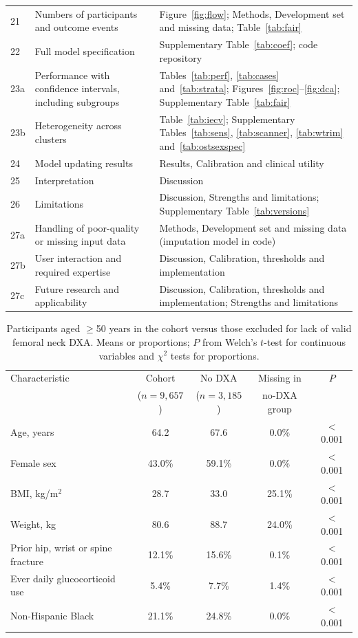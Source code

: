 \documentclass[11pt,a4paper]{article}
\begin{document}
\begin{longtable}{p{1.0cm}p{6.4cm}p{7.1cm}}
21 & Numbers of participants and outcome events & Figure~\ref{fig:flow}; Methods, Development set and missing data; Table~\ref{tab:fair} \\
22 & Full model specification & Supplementary Table~\ref{tab:coef}; code repository \\
23a & Performance with confidence intervals, including subgroups & Tables~\ref{tab:perf}, \ref{tab:cases} and~\ref{tab:strata}; Figures~\ref{fig:roc}--\ref{fig:dca}; Supplementary Table~\ref{tab:fair} \\
23b & Heterogeneity across clusters & Table~\ref{tab:iecv}; Supplementary Tables~\ref{tab:sens}, \ref{tab:scanner}, \ref{tab:wtrim} and~\ref{tab:ostsexspec} \\
24 & Model updating results & Results, Calibration and clinical utility \\
25 & Interpretation & Discussion \\
26 & Limitations & Discussion, Strengths and limitations; Supplementary Table~\ref{tab:versions} \\
27a & Handling of poor-quality or missing input data & Methods, Development set and missing data (imputation model in code) \\
27b & User interaction and required expertise & Discussion, Calibration, thresholds and implementation \\
27c & Future research and applicability & Discussion, Calibration, thresholds and implementation; Strengths and limitations \\
\end{longtable}
\normalsize

\begin{table}[H]
\centering
\caption{Participants aged $\ge$50 years in the cohort versus those excluded for lack of valid femoral neck DXA. Means or proportions; $P$ from Welch's $t$-test for continuous variables and $\chi^2$ tests for proportions.}
\label{tab:excl}
\small
\begin{tabular}{lcccc}
\toprule
Characteristic & Cohort & No DXA & Missing in & $P$ \\
 & ($n=9{,}657$) & ($n=3{,}185$) & no-DXA group & \\
\midrule
Age, years & 64.2 & 67.6 & 0.0\% & $<$0.001 \\
Female sex & 43.0\% & 59.1\% & 0.0\% & $<$0.001 \\
BMI, kg/m$^2$ & 28.7 & 33.0 & 25.1\% & $<$0.001 \\
Weight, kg & 80.6 & 88.7 & 24.0\% & $<$0.001 \\
Prior hip, wrist or spine fracture & 12.1\% & 15.6\% & 0.1\% & $<$0.001 \\
Ever daily glucocorticoid use & 5.4\% & 7.7\% & 1.4\% & $<$0.001 \\
Non-Hispanic Black & 21.1\% & 24.8\% & 0.0\% & $<$0.001 \\
\bottomrule
\end{tabular}
\end{table}
\end{document}
